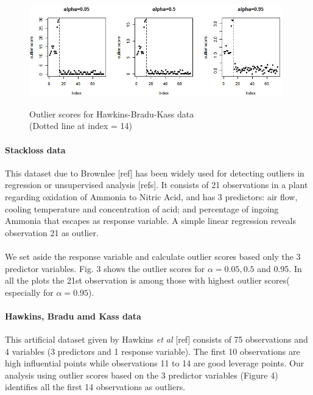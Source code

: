 \documentclass[10pt]{article}
\begin{document}
\begin{figure}[t]
	\centering
		\includegraphics[height=4cm]{outlier_hbk.png}\\
	\label{fig:fig4}
	\caption{Outlier scores for Hawkins-Bradu-Kass data \\(Dotted line at index = 14)}
\end{figure}

\paragraph{Stackloss data}This dataset due to Brownlee [ref] has been widely used for detecting outliers in regression or unsupervised analysis [refs]. It consists of 21 observations in a plant regarding oxidation of Ammonia to Nitric Acid, and has 3 predictors: air flow, cooling temperature and concentration of acid; and percentage of ingoing Ammonia that escapes as response variable. A simple linear regression reveals observation 21 as outlier.

\paragraph{}We set aside the response variable and calculate outlier scores based only the 3 predictor variables. Fig. 3 shows the outlier scores for $\alpha = 0.05, 0.5$ and 0.95. In all the plots the 21st observation is among those with highest outlier scores( especially for $\alpha = 0.95$).

\paragraph{Hawkins, Bradu amd Kass data}This artificial dataset given by Hawkins \textit{et al} [ref] consists of 75 observations and 4 variables (3 predictors and 1 response variable). The first 10 observations are high influential points while observations 11 to 14 are good leverage points. Our analysis using outlier scores based on the 3 predictor variables (Figure 4) identifies all the first 14 observations as outliers.

\end{document}
